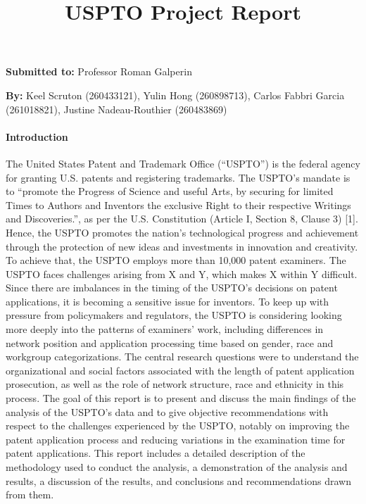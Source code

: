 \documentclass[
]{article}
\title{USPTO Project Report}
\author{}
\date{\vspace{-2.5em}}
\begin{document}
\maketitle

\textbf{Submitted to:} Professor Roman Galperin

\textbf{By:} Keel Scruton (260433121), Yulin Hong (260898713), Carlos
Fabbri Garcia (261018821), Justine Nadeau-Routhier (260483869)

\hypertarget{introduction}{%
\paragraph{Introduction}\label{introduction}}

The United States Patent and Trademark Office (``USPTO'') is the federal
agency for granting U.S. patents and registering trademarks. The USPTO's
mandate is to ``promote the Progress of Science and useful Arts, by
securing for limited Times to Authors and Inventors the exclusive Right
to their respective Writings and Discoveries.'', as per the U.S.
Constitution (Article I, Section 8, Clause 3) {[}1{]}. Hence, the USPTO
promotes the nation's technological progress and achievement through the
protection of new ideas and investments in innovation and creativity. To
achieve that, the USPTO employs more than 10,000 patent examiners. The
USPTO faces challenges arising from X and Y, which makes X within Y
difficult. Since there are imbalances in the timing of the USPTO's
decisions on patent applications, it is becoming a sensitive issue for
inventors. To keep up with pressure from policymakers and regulators,
the USPTO is considering looking more deeply into the patterns of
examiners' work, including differences in network position and
application processing time based on gender, race and workgroup
categorizations. The central research questions were to understand the
organizational and social factors associated with the length of patent
application prosecution, as well as the role of network structure, race
and ethnicity in this process. The goal of this report is to present and
discuss the main findings of the analysis of the USPTO's data and to
give objective recommendations with respect to the challenges
experienced by the USPTO, notably on improving the patent application
process and reducing variations in the examination time for patent
applications. This report includes a detailed description of the
methodology used to conduct the analysis, a demonstration of the
analysis and results, a discussion of the results, and conclusions and
recommendations drawn from them.
\end{document}
